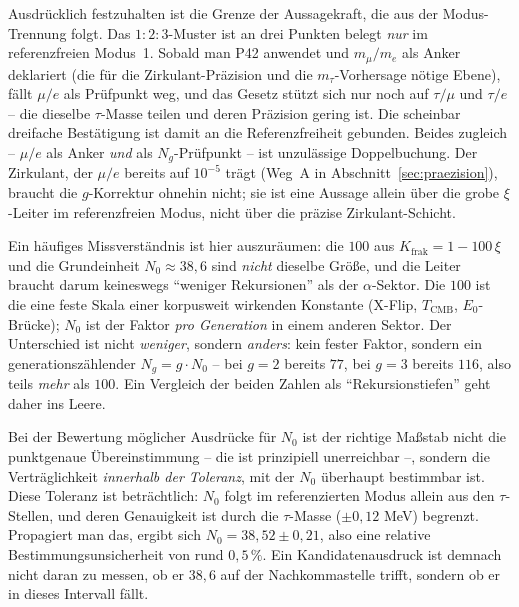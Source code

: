 Ausdrücklich festzuhalten ist die Grenze der Aussagekraft, die aus der
Modus-Trennung folgt. Das $1:2:3$-Muster ist an drei Punkten belegt
\emph{nur} im referenzfreien Modus~1. Sobald man P42 anwendet und $m_\mu/m_e$
als Anker deklariert (die für die Zirkulant-Präzision und die
$m_\tau$-Vorhersage nötige Ebene), fällt $\mu/e$ als Prüfpunkt weg, und das
Gesetz stützt sich nur noch auf $\tau/\mu$ und $\tau/e$ -- die dieselbe
$\tau$-Masse teilen und deren Präzision gering ist. Die scheinbar dreifache
Bestätigung ist damit an die Referenzfreiheit gebunden. Beides zugleich --
$\mu/e$ als Anker \emph{und} als $N_g$-Prüfpunkt -- ist unzulässige
Doppelbuchung. Der Zirkulant, der $\mu/e$ bereits auf $10^{-5}$ trägt (Weg~A
in Abschnitt~\ref{sec:praezision}), braucht die $g$-Korrektur ohnehin nicht;
sie ist eine Aussage allein über die grobe $\xi$-Leiter im referenzfreien
Modus, nicht über die präzise Zirkulant-Schicht.

Ein häufiges Missverständnis ist hier auszuräumen: die $100$ aus
$K_{\text{frak}}=1-100\,\xi$ und die Grundeinheit $N_0\approx38{,}6$ sind
\emph{nicht} dieselbe Größe, und die Leiter braucht darum keineswegs
\enquote{weniger Rekursionen} als der $\alpha$-Sektor. Die $100$ ist die
eine feste Skala einer korpusweit wirkenden Konstante (X-Flip,
$T_{\text{CMB}}$, $E_0$-Brücke); $N_0$ ist der Faktor \emph{pro Generation}
in einem anderen Sektor. Der Unterschied ist nicht \emph{weniger}, sondern
\emph{anders}: kein fester Faktor, sondern ein generationszählender
$N_g=g\cdot N_0$ -- bei $g=2$ bereits $77$, bei $g=3$ bereits $116$, also
teils \emph{mehr} als $100$. Ein Vergleich der beiden Zahlen als
\enquote{Rekursionstiefen} geht daher ins Leere.

Bei der Bewertung möglicher Ausdrücke für $N_0$ ist der richtige Maßstab
nicht die punktgenaue Übereinstimmung -- die ist prinzipiell unerreichbar --,
sondern die Verträglichkeit \emph{innerhalb der Toleranz}, mit der $N_0$
überhaupt bestimmbar ist. Diese Toleranz ist beträchtlich: $N_0$ folgt im
referenzierten Modus allein aus den $\tau$-Stellen, und deren Genauigkeit
ist durch die $\tau$-Masse ($\pm0{,}12$ MeV) begrenzt. Propagiert man das,
ergibt sich $N_0 = 38{,}52 \pm 0{,}21$, also eine relative Bestimmungs\-un\-si\-cher\-heit
von rund $0{,}5\,\%$. Ein Kandidatenausdruck ist demnach nicht daran zu
messen, ob er $38{,}6$ auf der Nachkommastelle trifft, sondern ob er in
dieses Intervall fällt.

